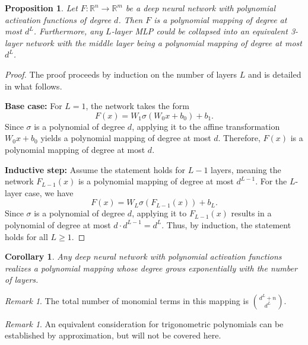 \documentclass{article} %
\theoremstyle{plain}
\newtheorem{proposition}[theorem]{Proposition}
\newtheorem{corollary}[theorem]{Corollary}
\theoremstyle{definition}
\theoremstyle{remark}
\newtheorem{remark}[theorem]{Remark}
\begin{document}
\begin{proposition}
\label{prop:mapping}
    Let $F: \mathbb{R}^n \to \mathbb{R}^m$ be a deep neural network with polynomial activation functions of degree $d$. Then $F$ is a polynomial mapping of degree at most $d^L$. Furthermore, any $L$-layer MLP could be collapsed into an equivalent 3-layer network with the middle layer being a polynomial mapping of degree at most $d^L$.
\end{proposition}
\begin{proof}
    The proof proceeds by induction on the number of layers $L$ and is detailed in what follows.
    
    \textbf{Base case:} For $L = 1$, the network takes the form
    \[
        F(x) = W_1 \sigma(W_0 x + b_0) + b_1.
    \]
    Since $\sigma$ is a polynomial of degree $d$, applying it to the affine transformation $W_0 x + b_0$ yields a polynomial mapping of degree at most $d$. Therefore, $F(x)$ is a polynomial mapping of degree at most $d$.

    \textbf{Inductive step:} Assume the statement holds for $L-1$ layers, meaning the network $F_{L-1}(x)$ is a polynomial mapping of degree at most $d^{L-1}$. For the $L$-layer case, we have
    \[
        F(x) = W_L \sigma(F_{L-1}(x)) + b_L.
    \]
    Since $\sigma$ is a polynomial of degree $d$, applying it to $F_{L-1}(x)$ results in a polynomial of degree at most $d \cdot d^{L-1} = d^L$. Thus, by induction, the statement holds for all $L \geq 1$.
\end{proof}

\begin{corollary}
    Any deep neural network with polynomial activation functions realizes a polynomial mapping whose degree grows exponentially with the number of layers.
\end{corollary}

\begin{remark}
    The total number of monomial terms in this mapping is $\binom{d^L + n}{d^L}$.
\end{remark}

\begin{remark}
An equivalent consideration for trigonometric polynomials can be established by approximation, but will not be covered here.
\end{remark}
\end{document}
